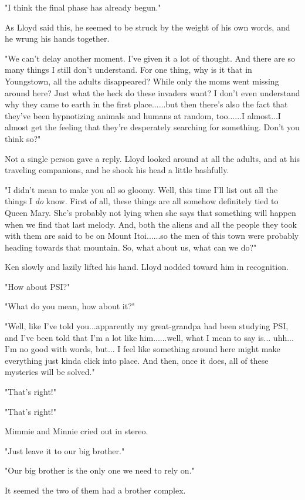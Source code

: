 \documentclass[
]{article}
\begin{document}
"I think the final phase has already begun."

As Lloyd said this, he seemed to be struck by the weight of his own
words, and he wrung his hands together.

"We can't delay another moment. I've given it a lot of thought. And
there are so many things I still don't understand. For one thing, why is
it that in Youngstown, all the adults disappeared? While only the moms
went missing around here? Just what the heck do these invaders want? I
don't even understand why they came to earth in the first place......but
then there's also the fact that they've been hypnotizing animals and
humans at random, too......I almost...I almost get the feeling that
they're desperately searching for something. Don't you think so?"

Not a single person gave a reply. Lloyd looked around at all the adults,
and at his traveling companions, and he shook his head a little
bashfully.

"I didn't mean to make you all so gloomy. Well, this time I'll list out
all the things I \emph{do} know. First of all, these things are all
somehow definitely tied to Queen Mary. She's probably not lying when she
says that something will happen when we find that last melody. And, both
the aliens and all the people they took with them are said to be on
Mount Itoi......so the men of this town were probably heading towards
that mountain. So, what about us, what can we do?"

Ken slowly and lazily lifted his hand. Lloyd nodded toward him in
recognition.

"How about PSI?"

"What do you mean, how about it?"

"Well, like I've told you...apparently my great-grandpa had been
studying PSI, and I've been told that I'm a lot like him......well, what
I mean to say is... uhh... I'm no good with words, but... I feel like
something around here might make everything just kinda click into place.
And then, once it does, all of these mysteries will be solved."

"That's right!"

"That's right!"

Mimmie and Minnie cried out in stereo.

"Just leave it to our big brother."

"Our big brother is the only one we need to rely on."

It seemed the two of them had a brother complex.
\end{document}
